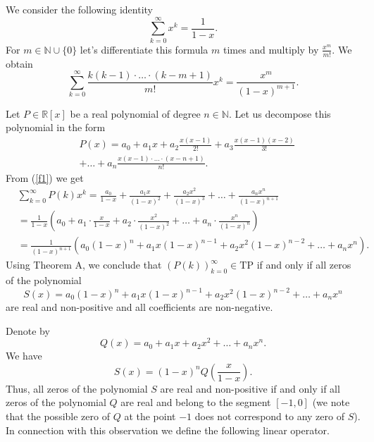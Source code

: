 \documentclass[12pt]{amsart}
\numberwithin{count}{section}
\begin{document}
We consider the following identity
$$ \sum_{k=0}^\infty x^k = \frac{1}{1-x}.  $$ 
For $m\in \mathbb{N}\cup \{0\}$  let's differentiate this formula 
$m$ times and multiply by $\frac{x^m}{m!}.$ We obtain
\begin{equation}
\label{f1}
\sum_{k=0}^\infty \frac{k(k-1)\cdot \ldots \cdot (k-m+1)}{m!} x^k
=\frac{x^m}{(1-x)^{m+1}}.
\end{equation}

Let $P\in \mathbb{R}[x]$ be a real polynomial of degree $n\in \mathbb{N}.$ 
Let us decompose this polynomial in the form
\begin{eqnarray}
\label{f2}
&
P(x)= a_0 + a_1 x +a_2 \frac{x(x-1)}{2!} +a_3 \frac{x(x-1)(x-2)}{3!}\\
\nonumber &
+  \ldots +a_n \frac{x(x-1)\cdot \ldots \cdot (x-n+1)}{n!}.
\end{eqnarray}
From (\ref{f1}) we get
\begin{eqnarray}
\label{f3}
&
\sum_{k=0}^\infty P(k) x^k= \frac{a_0}{1-x} +  \frac{a_1 x}{(1-x)^2} 
+ \frac{a_2 x^2}{(1-x)^3} + \ldots + \frac{a_n x^n}{(1-x)^{n+1}}\\
\nonumber &
=\frac{1}{1-x} \left(a_0 + a_1 \cdot \frac{x}{1-x} + a_2 \cdot \frac{x^2}{(1-x)^2} +
\ldots +  a_n \cdot \frac{x^n}{(1-x)^n} \right) \\
\nonumber &
=\frac{1}{(1-x)^{n+1}} \left(a_0 (1-x)^n + a_1 x(1-x)^{n-1} + a_2 x^2(1-x)^{n-2} +
\ldots +  a_nx^n\right).
\end{eqnarray}
Using Theorem A, we conclude that $(P(k))_{k=0}^\infty \in \mathrm{TP}$ if and only if all zeros of the
polynomial 
$$S(x)=a_0 (1-x)^n + a_1 x(1-x)^{n-1} + a_2 x^2(1-x)^{n-2} +
\ldots +  a_n x^n$$ 
are real and non-positive and  all coefficients are non-negative.

Denote by 
$$Q(x) =a_0 +a_1 x +a_2 x^2 + \ldots + a_n x^n.$$
We have
\begin{equation}
\label{ff1}
S(x) =(1-x)^n Q\left(\frac{x}{1-x}\right).
\end{equation}
Thus, all zeros of the polynomial $S$ are real and non-positive if and only if all zeros of the 
polynomial $Q$ are real and belong to the segment $[-1, 0]$ (we note that the possible zero of $Q$ 
at the point $-1$ does not correspond to any zero of $S$).
In connection with this observation we define the following linear operator.
\end{document}
